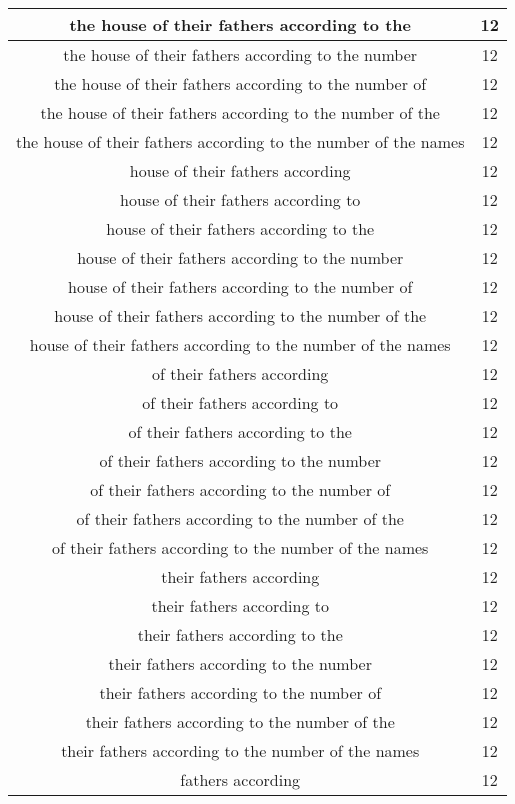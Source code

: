 \begin{center}
\begin{longtable}{|c|c|}
the house of their fathers according to the & 12\\ \hline 
the house of their fathers according to the number & 12\\ \hline 
the house of their fathers according to the number of & 12\\ \hline 
the house of their fathers according to the number of the & 12\\ \hline 
the house of their fathers according to the number of the names & 12\\ \hline 
house of their fathers according & 12\\ \hline 
house of their fathers according to & 12\\ \hline 
house of their fathers according to the & 12\\ \hline 
house of their fathers according to the number & 12\\ \hline 
house of their fathers according to the number of & 12\\ \hline 
house of their fathers according to the number of the & 12\\ \hline 
house of their fathers according to the number of the names & 12\\ \hline 
of their fathers according & 12\\ \hline 
of their fathers according to & 12\\ \hline 
of their fathers according to the & 12\\ \hline 
of their fathers according to the number & 12\\ \hline 
of their fathers according to the number of & 12\\ \hline 
of their fathers according to the number of the & 12\\ \hline 
of their fathers according to the number of the names & 12\\ \hline 
their fathers according & 12\\ \hline 
their fathers according to & 12\\ \hline 
their fathers according to the & 12\\ \hline 
their fathers according to the number & 12\\ \hline 
their fathers according to the number of & 12\\ \hline 
their fathers according to the number of the & 12\\ \hline 
their fathers according to the number of the names & 12\\ \hline 
fathers according & 12\\ \hline 

\end{longtable}
\end{center}
